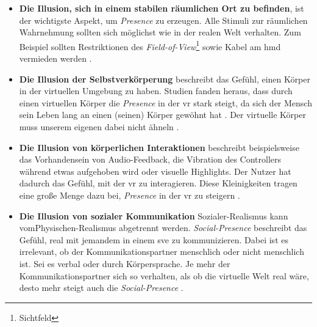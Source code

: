 \documentclass[a4paper,11pt]{article}%
\renewcommand{\\}{\vspace*{0.5\baselineskip} \newline}
\begin{document}
\begin{itemize}
	\item{\textbf{Die Illusion, sich in einem stabilen räumlichen Ort zu befinden}}, ist der wichtigste Aspekt, um \textit{Presence} zu erzeugen. Alle Stimuli zur räumlichen Wahrnehmung sollten sich möglichst wie in der realen Welt verhalten. Zum Beispiel sollten Restriktionen des  \textit{Field-of-View}\footnote{Sichtfeld} sowie Kabel am \ac{hmd} vermieden werden \citep[p.47]{jerald2015vr}.
	\item{\textbf{Die Illusion der Selbstverkörperung}} beschreibt das Gefühl, einen Körper in der virtuellen Umgebung zu haben. Studien fanden heraus, dass durch einen virtuellen Körper die \textit{Presence} in der \ac{vr} stark steigt, da sich der Mensch sein Leben lang an einen (seinen) Körper gewöhnt hat \citep[p.756]{botvinick1998rubber}. Der virtuelle Körper muss unserem eigenen dabei nicht ähneln \citep[p.7]{maxwell1960psycho}.
	\item{\textbf{Die Illusion von körperlichen Interaktionen}} beschreibt beispielsweise das Vorhandensein von Audio-Feedback, die Vibration des Controllers während etwas aufgehoben wird oder visuelle Highlights. Der Nutzer hat dadurch das Gefühl, mit der \ac{vr} zu interagieren. Diese Kleinigkeiten tragen eine große Menge dazu bei, \textit{Presence} in der \ac{vr} zu steigern \citep[p.48]{jerald2015vr}.
	\item{\textbf{Die Illusion von sozialer Kommunikation}} Sozialer-Realismus kann vom\newline Physischen-Realismus abgetrennt werden.  \textit{Social-Presence} beschreibt das Gefühl, real mit jemandem in einem \ac{sve} zu kommunizieren. Dabei ist es irrelevant, ob der Kommunikationspartner menschlich oder nicht menschlich ist. Sei es verbal oder durch Körpersprache. Je mehr der Kommunikationspartner sich so verhalten, als ob die virtuelle Welt real wäre, desto mehr steigt auch die \textit{Social-Presence} \citep[p.49]{jerald2015vr} \citep[p.12]{guadagno2007virtual}.
\end{itemize}

\end{document}
